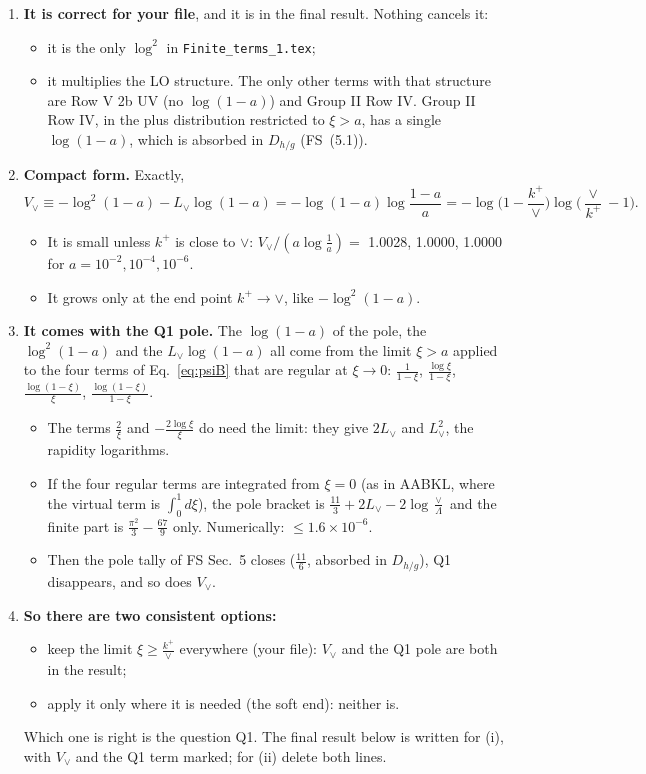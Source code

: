 \documentclass[10pt]{article}
\numberwithin{equation}{section}
\newcommand{\Lv}{L_{\vee}}
\begin{document}
\begin{enumerate}
\item \textbf{It is correct for your file}, and it is in the final result. Nothing cancels it:
\begin{itemize}
\item it is the only $\log^2$ in \texttt{Finite\_terms\_1.tex};
\item it multiplies the LO structure. The only other terms with that structure are Row V 2b UV (no $\log(1-a)$) and Group II Row IV. Group II Row IV, in the plus distribution restricted to $\xi>a$, has a single $\log(1-a)$, which is absorbed in $D_{h/g}$ (FS~(5.1)).
\end{itemize}
\item \textbf{Compact form.} Exactly,
\begin{equation}
V_\vee\equiv-\log^2(1-a)-\Lv\log(1-a)=-\log(1-a)\log\frac{1-a}{a}=-\log\Big(1-\frac{k^+}{\vee}\Big)\log\Big(\frac{\vee}{k^+}-1\Big).
\label{eq:Vv}
\end{equation}
\begin{itemize}
\item It is small unless $k^+$ is close to $\vee$: $V_\vee/(a\log\frac1a)=$ 1.0028, 1.0000, 1.0000 for $a=10^{-2},10^{-4},10^{-6}$.
\item It grows only at the end point $k^+\to\vee$, like $-\log^2(1-a)$.
\end{itemize}
\item \textbf{It comes with the Q1 pole.} The $\log(1-a)$ of the pole, the $\log^2(1-a)$ and the $\Lv\log(1-a)$ all come from the limit $\xi>a$ applied to the four terms of Eq.~\eqref{eq:psiB} that are regular at $\xi\to0$: $\frac{1}{1-\xi}$, $\frac{\log\xi}{1-\xi}$, $\frac{\log(1-\xi)}{\xi}$, $\frac{\log(1-\xi)}{1-\xi}$.
\begin{itemize}
\item The terms $\frac2\xi$ and $-\frac{2\log\xi}{\xi}$ do need the limit: they give $2\Lv$ and $\Lv^2$, the rapidity logarithms.
\item If the four regular terms are integrated from $\xi=0$ (as in AABKL, where the virtual term is $\int_0^1d\xi$), the pole bracket is $\frac{11}{3}+2\Lv-2\log\frac\vee\Lambda$ and the finite part is $\frac{\pi^2}{3}-\frac{67}{9}$ only. Numerically: $\le$$1.6\times10^{-6}$.
\item Then the pole tally of FS Sec.~5 closes ($\frac{11}{6}$, absorbed in $D_{h/g}$), Q1 disappears, and so does $V_\vee$.
\end{itemize}
\item \textbf{So there are two consistent options:}
\begin{itemize}
\item[(i)] keep the limit $\xi\ge\frac{k^+}{\vee}$ everywhere (your file): $V_\vee$ and the Q1 pole are both in the result;
\item[(ii)] apply it only where it is needed (the soft end): neither is.
\end{itemize}
Which one is right is the question Q1. The final result below is written for (i), with $V_\vee$ and the Q1 term marked; for (ii) delete both lines.
\end{enumerate}
\end{document}
